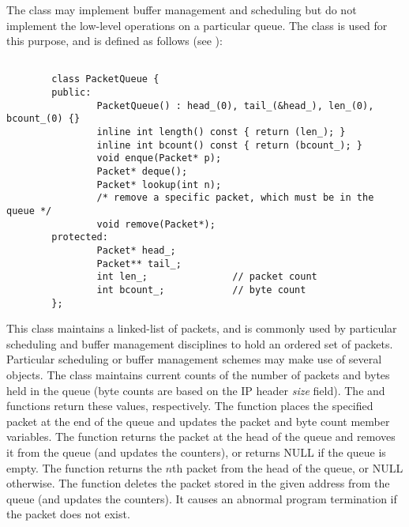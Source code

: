 The  class may implement buffer management and scheduling but
do not implement the low-level operations on a particular queue.
The  class is used for this purpose, and is defined as follows
(see ):
\begin{small}
\begin{verbatim}

        class PacketQueue {
        public:
                PacketQueue() : head_(0), tail_(&head_), len_(0), bcount_(0) {}
                inline int length() const { return (len_); }
                inline int bcount() const { return (bcount_); }
                void enque(Packet* p);
                Packet* deque();
                Packet* lookup(int n);
                /* remove a specific packet, which must be in the queue */
                void remove(Packet*);
        protected:
                Packet* head_;
                Packet** tail_;
                int len_;               // packet count
                int bcount_;            // byte count
        };
\end{verbatim}
\end{small}

This class maintains a linked-list of packets, and is commonly
used by particular scheduling and buffer management disciplines
to hold an ordered set of packets.
Particular scheduling or buffer management schemes may make
use of several  objects.
The  class maintains current counts of the number of
packets and bytes held in the queue
(byte counts are based on the IP header {\em size} field).
The  and  functions return these values,
respectively.
The  function places the specified packet at the end of
the queue and updates the packet and byte count member variables.
The  function returns the packet at the head of the
queue and removes it from the queue (and updates the counters), or
returns NULL if the queue is empty.
The  function returns the $n$th packet from the head
of the queue, or NULL otherwise.
The  function deletes the packet stored in the given address
from the queue (and updates the counters).
It causes an abnormal program termination if the packet does not exist.

\subsection{}

